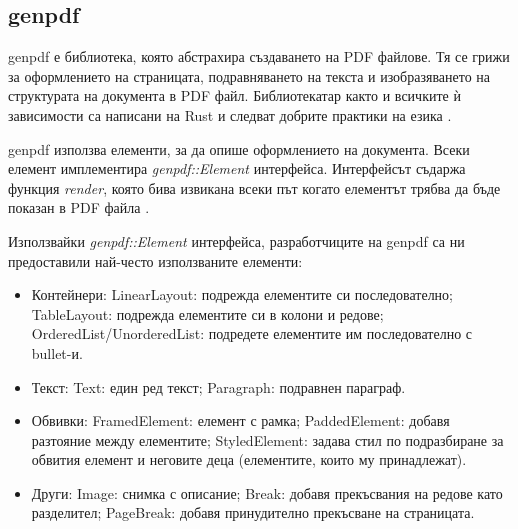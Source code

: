 \subsection{genpdf}
genpdf е библиотека, която абстрахира създаването на PDF файлове. Тя се грижи за
оформлението на страницата, подравняването на текста и изобразяването на
структурата на документа в PDF файл. Библиотекатар както и всичките ѝ зависимости
са написани на Rust и следват добрите практики на езика
\cite{genpdf_repository}.

genpdf използва елементи, за да опише оформлението на документа. Всеки елемент
имплементира \textit{genpdf::Element} интерфейса. Интерфейсът съдаржа функция \textit{render}, която бива
извикана всеки път когато елементът трябва да бъде показан в PDF файла
\cite{genpdf_element_trait}.

Използвайки \textit{genpdf::Element} интерфейса, разработчиците на genpdf са ни предоставили
най-често използваните елементи:
\begin{itemize}
    \item Контейнери:
        \subitem LinearLayout: подрежда елементите си последователно;
        \subitem TableLayout: подрежда елементите си в колони и редове;
        \subitem OrderedList/UnorderedList: подредете елементите им последователно с bullet-и.
    \item Текст:
        \subitem Text: един ред текст;
        \subitem Paragraph: подравнен параграф.
    \item Обвивки:
        \subitem FramedElement: елемент с рамка;
        \subitem PaddedElement: добавя разтояние между елементите;
        \subitem StyledElement: задава стил по подразбиране за обвития елемент и неговите деца (елементите, които му принадлежат).
    \item Други:
        \subitem Image: снимка с описание;
        \subitem Break: добавя прекъсвания на редове като разделител;
        \subitem PageBreak: добавя принудително прекъсване на страницата.
\end{itemize}

